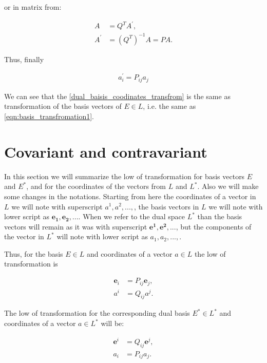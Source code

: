 \documentclass{book}
\begin{document}
or in matrix from:

\begin{align*}
A &= Q^{T}A^{'}, \\
A^{'} &= (Q^{T})^{-1}A = PA.
\end{align*}

Thus, finally

\begin{align}
a_{i}^{'} = P_{ij}a_{j} \label{dual_baisis_coodinates_transfrom}
\end{align}

We can see that the \eqref{dual_baisis_coodinates_transfrom} is the same as transformation of the basis vectors of $E \in L$, i.e. the same as \eqref{eqn:basis_transfromation1}.

\section{Covariant and contravariant}

In this section we will summarize the low of transformation for basis vectors $E$ and $E^*$, and for the coordinates of the vectors from $L$ and $L^*$. Also we will make some changes in the notations.
Starting from here the coordinates of a vector in $L$ we will note with superscript $a^1, a^2,...,$, the basis vectors in $L$ we will note with lower script as $\boldsymbol{e_1}, \boldsymbol{e_2},...$.
When we refer to the dual space $L^*$ than the basis vectors will remain as it was with superscript $\boldsymbol{e^1}, \boldsymbol{e^2},...$, but the components of the vector in $L^*$ will note with lower script as $a_1, a_2,...,$. 

Thus, for the basis $E \in L$ and coordinates of a vector $a \in L$ the low of transformation is

\begin{align}
\boldsymbol{e}_{i} &= P_{ij}\boldsymbol{e}_{j}, \label{covariant_transformation_low} \\
a^{i} &= Q_{ij}a^{j}. \label{contravariant_transformation_low}
\end{align}

The low of transformation for the corresponding dual basis $E^{*} \in L^{*}$ and coordinates of a vector $a \in L^*$ will be:

\begin{align}
\boldsymbol{e}^{i} &= Q_{ij}\boldsymbol{e}^{j}, \label{dual_contravariant_transformation_low} \\
a_{i} &= P_{ij}a_{j}. \label{dual_covariant_transformation_low}
\end{align}
\end{document}
